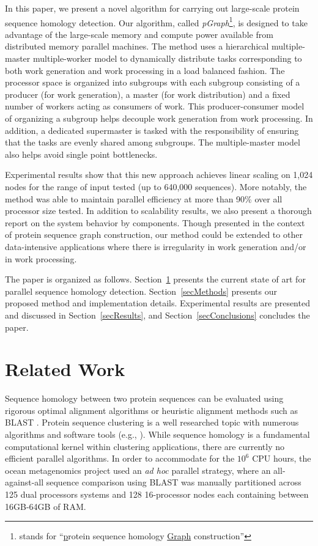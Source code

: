\documentclass[10pt,journal,letterpaper,compsoc]{IEEEtran}
\begin{document}
In this paper, we present a novel algorithm for carrying out large-scale protein sequence homology detection. Our algorithm, called {\it pGraph}\footnote{stands for ``\underline{p}rotein sequence homology \underline{Graph} construction''}, is designed to take advantage of the large-scale memory and compute power available from distributed memory parallel machines. The method uses a hierarchical multiple-master multiple-worker model to dynamically distribute tasks corresponding to both work generation and work processing in a load balanced fashion. The processor space is organized into subgroups with each subgroup consisting of a producer (for work generation), a master (for work distribution) and a fixed number of workers acting as consumers of work. This producer-consumer model of organizing a subgroup helps decouple work generation from work processing. In addition, a dedicated supermaster is tasked with the responsibility of ensuring that the tasks are evenly shared among subgroups. The multiple-master model also helps avoid single point bottlenecks.

Experimental results show that this new approach achieves linear scaling on 1,024 nodes for the range of input tested (up to 640,000 sequences). More notably, the method was able to maintain parallel efficiency at more than 90\% over all processor size tested. In addition to scalability results, we also present a thorough report on the system behavior by components. Though presented in the context of protein sequence graph construction, our method could be extended to other data-intensive applications where there is irregularity in work generation and/or in work processing. 

The paper is organized as follows. Section~\ref{secRelatedWork} presents the current state of art for parallel sequence homology detection. Section~\ref{secMethods} presents our proposed method and implementation details. Experimental results are presented and discussed in Section~\ref{secResults}, and Section~\ref{secConclusions} concludes the paper.




\section{Related Work}
\label{secRelatedWork}

Sequence homology between two protein sequences can be evaluated using rigorous optimal alignment algorithms \cite{Needleman70,Smith81} or heuristic alignment methods such as BLAST \cite{Altschul90}. Protein sequence clustering is a well researched topic with numerous algorithms and software tools (e.g., \cite{Apweiler04,Bateman04,Enright02,Kriventseva01,Olman07}). While sequence homology is a fundamental computational kernel within clustering applications, there are currently no efficient parallel algorithms. In order to accommodate for the $10^6$ CPU hours, the ocean metagenomics project \cite{Yooseph07} used an {\it ad hoc} parallel strategy, where an all-against-all sequence comparison using BLAST was manually partitioned across 125 dual processors systems and 128 16-processor nodes each containing between 16GB-64GB of RAM. 
\end{document}
